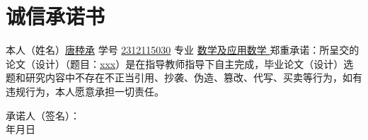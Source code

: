 \chapter*{诚信承诺书}

\thispagestyle{empty}


{
	
	本人（姓名）\uline{唐稑承} 学号 \uline{2312115030} 专业 \uline{数学及应用数学 }          郑重承诺：所呈交的论文（设计）（题目：\uline{xxx}）是在指导教师指导下自主完成，毕业论文（设计）选题和研究内容中不存在不正当引用、抄袭、伪造、篡改、代写、买卖等行为，如有违规行为，本人愿意承担一切责任。
	
	\vspace{40pt}
	
	\hfill 承诺人（签名）：\hspace*{4cm}\\
	\vspace{-10pt} 
	\hfill 年\hspace{26pt}月\hspace{26pt}日\hspace*{2cm}
}	

\clearpage